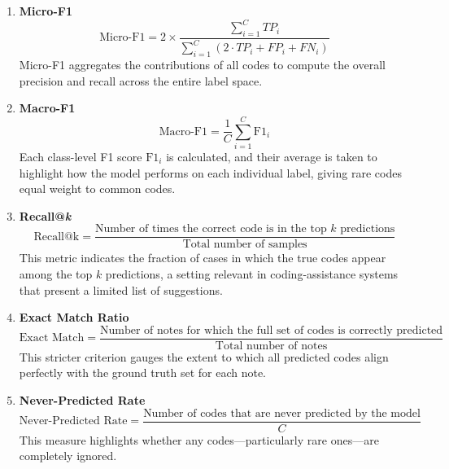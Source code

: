 \begin{enumerate}
    \item \textbf{Micro-F1}
    \begin{equation}\label{eq:p1:micro_f1}
        \text{Micro-F1} = 2 \times 
        \frac{\sum_{i=1}^{C} TP_{i}}
        {\sum_{i=1}^{C} (2 \cdot TP_{i} + FP_{i} + FN_{i})}
    \end{equation}
    Micro-F1 aggregates the contributions of all codes to compute the overall precision and recall across the entire label space.

    \item \textbf{Macro-F1}
    \begin{equation}\label{eq:p1:macro_f1}
        \text{Macro-F1} = \frac{1}{C} \sum_{i=1}^{C} \text{F1}_{i}
    \end{equation}
    Each class-level F1 score $\text{F1}_{i}$ is calculated, and their average is taken to highlight how the model performs on each individual label, giving rare codes equal weight to common codes.

    \item \textbf{Recall@\emph{k}}
    \begin{equation}\label{eq:p1:recall_at_k}
        \text{Recall@k} = 
        \frac{\text{Number of times the correct code is in the top } k \text{ predictions}}
        {\text{Total number of samples}}
    \end{equation}
    This metric indicates the fraction of cases in which the true codes appear among the top $k$ predictions, a setting relevant in coding-assistance systems that present a limited list of suggestions.

    \item \textbf{Exact Match Ratio}
    \begin{equation}\label{eq:p1:exact_match}
        \text{Exact Match} = 
        \frac{\text{Number of notes for which the full set of codes is correctly predicted}}
        {\text{Total number of notes}}
    \end{equation}
    This stricter criterion gauges the extent to which all predicted codes align perfectly with the ground truth set for each note.

    \item \textbf{Never-Predicted Rate}
    \begin{equation}\label{eq:p1:never_predicted}
        \text{Never-Predicted Rate} = 
        \frac{\text{Number of codes that are never predicted by the model}}{C}
    \end{equation}
    This measure highlights whether any codes---particularly rare ones---are completely ignored.
\end{enumerate}

